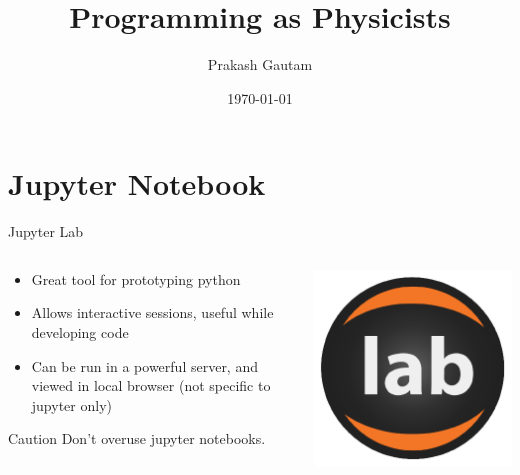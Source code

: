 \documentclass[aspectratio=169]{beamer}
\author{Prakash Gautam \\ \Nepali{[ प्रकाश गौतम ]}}
\title{Programming as Physicists}
\date{\today}
\begin{document}
\titlepage

\renewcommand{\bf}[1]{\textcolor{red!60}{#1}}

%
%
\section{Jupyter Notebook}
%
\begin{frame}{Jupyter Lab}
    \begin{columns}
        \begin{column}{0.49\textwidth}
            \begin{itemize}
                \item Great tool for prototyping python
                \item Allows interactive sessions, useful while developing code
                \item Can be run in a powerful server, and viewed in local browser (not specific to jupyter only)
            \end{itemize}
            \begin{block}{Caution}
                Don't overuse jupyter notebooks.
            \end{block}
        \end{column}
        \begin{column}{0.49\textwidth}
            \includegraphics[width=\linewidth]{images/jupyter_logo.png}
        \end{column}
    \end{columns}
\end{frame} 
\end{document}
